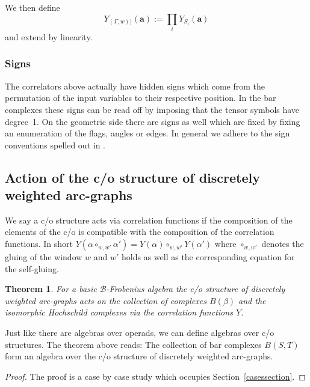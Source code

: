 \documentclass[pdftex]{sigma}
\newtheorem{thm}{Theorem}[section]
\def\B{\mathcal B}
\begin{document}
We then def\/ine{\samepage
\begin{equation}
\label{cordefgraph}
Y_{(\Gamma,w))}({\mathbf a}):=\prod_i Y_{S_i}({\mathbf a})
\end{equation}
and extend by linearity.}


\subsubsection{Signs} The correlators above actually have hidden signs which come
from the permutation of the input variables to their respective position. In the bar complexes these signs can be read of\/f by imposing that the tensor symbols have degree~1. On the geometric side
there are signs as well which are f\/ixed by f\/ixing an enumeration of the f\/lags, angles or edges.
In general we adhere to the sign conventions spelled out in \cite[Section 1.3.4]{hoch2}.




\subsection{Action of the c/o structure of discretely weighted arc-graphs}


We say a c/o structure acts via correlation functions if the
composition of the elements of the c/o is compatible with the
composition of the correlation functions. In short $Y(\alpha
\circ_{w,w'} \alpha')=Y(\alpha)  \circ_{w,w'} Y(\alpha')$ where
$\circ_{w,w'} $ denotes the gluing of the window $w$ and $w'$ holds
as well as the corresponding equation for the self-gluing.


\begin{thm}
\label{discretethm} For a basic  $\B$-Frobenius algebra the c/o
structure of discretely weighted arc-graphs acts  on  the
collection of complexes $B(\beta)$ and the isomorphic Hochschild
complexes via the correlation functions $Y$.
\end{thm}

Just like there are algebras over operads, we can def\/ine algebras
over c/o structures.  The theorem above reads: The collection of bar
complexes $B(S,T)$ form an algebra over the c/o structure of
discretely weighted arc-graphs.

\begin{proof}
The proof is a case by case study which occupies Section~\ref{casessection}.
\end{proof}
\end{document}
